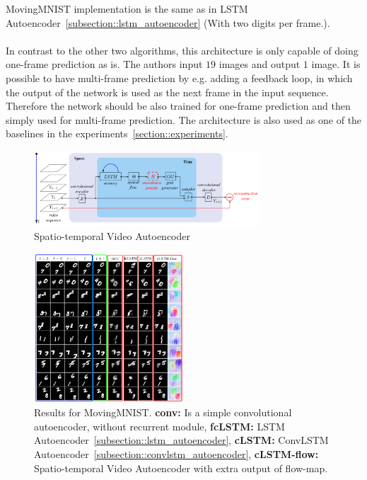   MovingMNIST implementation is the same as in LSTM Autoencoder~\ref{subsection::lstm_autoencoder} (With two digits per frame.).
  \\\\
  In contrast to the other two algorithms, this architecture is only capable of doing one-frame prediction as is. The authors input $19$ images and output $1$ 
  image. It is possible to have multi-frame prediction by e.g. adding a feedback loop, in which the output of the network is used as the next frame in the input 
  sequence. Therefore the network should be also trained for one-frame prediction and then simply used for multi-frame prediction. The architecture is also used
  as one of the baselines in the experiments~\ref{section::experiments}.
  \begin{figure}[H]
   \includegraphics[width=0.75\textwidth]{../Images/patraucean.png}
   \centering
   \caption{Spatio-temporal Video Autoencoder \cite{Patraucean2015}}
   \label{fig:spatiotemp_architecture}
  \end{figure}
  \begin{figure}[H]
   \includegraphics[width=0.5\textwidth]{../Images/patraucean_results_mnist.png}
   \centering
   \caption{Results for MovingMNIST. \textbf{conv:} Is a simple convolutional autoencoder, without recurrent module, \textbf{fcLSTM:} LSTM Autoencoder~\ref{subsection::lstm_autoencoder},
   \textbf{cLSTM:} ConvLSTM Autoencoder~\ref{subsection::convlstm_autoencoder}, \textbf{cLSTM-flow:} Spatio-temporal Video Autoencoder with extra output of flow-map. \cite{Patraucean2015}}
   \label{fig:spatiotemp_results}
  \end{figure}
 
